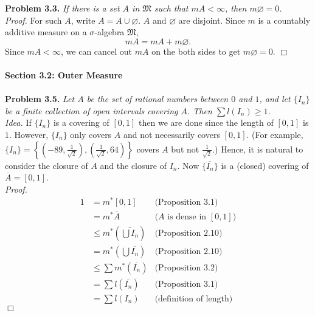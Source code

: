 \documentclass{article}
\begin{document}
\textbf{Problem 3.3.}
\emph{If there is a set $A$ in $\mathfrak{M}$ such that $mA < \infty$,
then $m\varnothing = 0$.} \\

\emph{Proof.}
For such $A$, write $A = A \cup \varnothing$.
$A$ and $\varnothing$ are disjoint.
Since $m$ is a countably additive measure
on a $\sigma$-algebra $\mathfrak{M}$,
$$mA = mA + m\varnothing.$$
Since $mA < \infty$,
we can cancel out $mA$ on the both sides to get
$m\varnothing = 0$.
$\Box$ \\\\



\textbf{\large Section 3.2: Outer Measure} \\\\



\textbf{Problem 3.5.}
\emph{Let $A$ be the set of rational numbers between $0$ and $1$, and
let $\{ I_n\}$ be a finite collection of open intervals covering $A$.
Then $\sum l(I_n) \geq 1$.} \\

\emph{Idea.}
If $\{ I_n\}$ is a covering of $[0, 1]$ then we are done
since the length of $[0, 1]$ is $1$.
However, $\{ I_n\}$ only covers $A$ and not necessarily covers $[0, 1]$.
(For example,
$\{ I_n\}
= \left\{
\left( -89, \frac{1}{\sqrt{2}} \right),
\left( \frac{1}{\sqrt{2}}, 64 \right)
\right\}$ covers $A$ but not $\frac{1}{\sqrt{2}}$.)
Hence, it is natural to consider the closure of $A$ and
the closure of $I_n$.
Now $\{ \overline{I_n} \}$ is a (closed) covering of
$\overline{A} = [0, 1]$. \\

\emph{Proof.}
\begin{align*}
1
&= m^{*}[0, 1]
  &\text{(Proposition 3.1)} \\
&= m^{*}\overline{A}
  &\text{($A$ is dense in $[0, 1]$)} \\
&\leq m^{*}\left( \overline{\bigcup I_n} \right)
  &\text{(Proposition 2.10)} \\
&= m^{*}\left( \bigcup \overline{I_n} \right)
  &\text{(Proposition 2.10)} \\
&\leq \sum m^{*}(\overline{I_n})
  &\text{(Proposition 3.2)} \\
&= \sum l(\overline{I_n})
  &\text{(Proposition 3.1)} \\
&= \sum l(I_n)
  &\text{(definition of length)}
\end{align*}
$\Box$ \\\\
\end{document}
